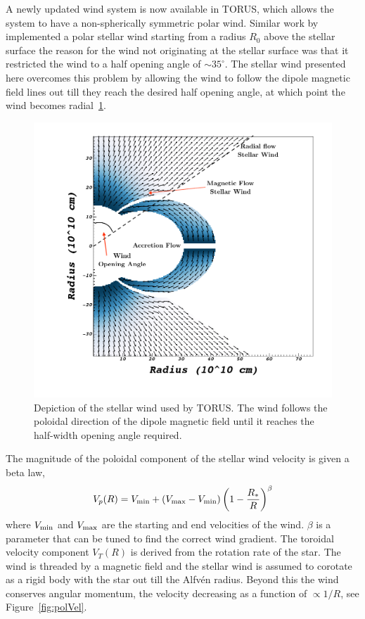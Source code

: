 \documentclass[fleqn,usenatbib]{mnras}
\begin{document}
A newly updated wind system is now available in TORUS, which allows the system to have a non-spherically symmetric polar wind. Similar work by \citet{Kurosawa:2011fh} implemented a polar stellar wind starting from a radius $R_0$ above the stellar surface the reason for the wind not originating at the stellar surface was that it restricted the wind to a half opening angle of $\sim 35^{\circ}$. The stellar wind presented here overcomes this problem by allowing the wind to follow the dipole magnetic field lines out till they reach the desired half opening angle, at which point the wind becomes radial~\ref{fig:wind}.
\begin{figure}
    \centering
    \includegraphics[width=\linewidth]{figures/wind}
    \caption{Depiction of the stellar wind used by TORUS. The wind follows the poloidal direction of the dipole magnetic field until it reaches the half-width opening angle required.}
    \label{fig:wind}
\end{figure}
The magnitude of the poloidal component of the stellar wind velocity is given a beta law,
\begin{equation}
    V_{p}(R) = V_{\rm min} + \left( V_{\rm max}-V_{\rm min}\right)\left(1-\frac{R_{\ast}}{R}\right)^{\beta}
    \label{eq:beta}
\end{equation}
where $V_{\rm min}$ and $V_{\rm max}$ are the starting and end velocities of the wind. $\beta$ is a parameter that can be tuned to find the correct wind gradient. The toroidal velocity component $V_{T}(R)$ is derived from the rotation rate of the star. The wind is threaded by a magnetic field and the stellar wind is assumed to corotate as a rigid body with the star out till the Alfv\'en radius. Beyond this the wind conserves angular momentum, the velocity decreasing as a function of $\propto 1/R$, see Figure~\ref{fig:polVel}.
\end{document}
